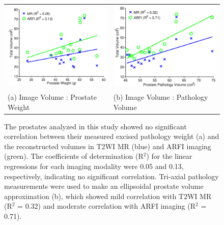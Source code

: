 \begin{figure}[htb!]
\centering
\begin{tabular}{ll}
\includegraphics[width=0.33\linewidth]{figs/corr_weight_vol.pdf} &
\includegraphics[width=0.33\linewidth]{figs/corr_pathVol_vol.pdf} \\
(a) Image Volume : Prostate Weight & (b) Image Volume : Pathology Volume \\
\end{tabular}
\caption{The prostates analyzed in this study showed no significant correlation
    between their measured excised pathology weight (a) and the reconstructed
    volumes in T2WI MR (blue) and ARFI imaging (green).  The coefficients of
    determination (R$^2$) for the linear regressions for each imaging modality
    were 0.05 and 0.13, respectively, indicating no significant correlation.
    Tri-axial pathology measurements were used to make an ellipsoidal prostate
    volume approximation (b), which showed mild correlation with T2WI MR (R$^2$
    = 0.32) and moderate correlation with ARFI imaging (R$^2$ = 0.71).}
\label{fig:mr_arfi_weight} 
\end{figure}
